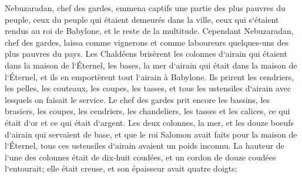 \verse Nebuzaradan, chef des gardes, emmena captifs une partie des plus pauvres du peuple, ceux du peuple qui étaient demeurés dans la ville, ceux qui s`étaient rendus au roi de Babylone, et le reste de la multitude. 
\verse Cependant Nebuzaradan, chef des gardes, laissa comme vignerons et comme laboureurs quelques-uns des plus pauvres du pays. 
\verse Les Chaldéens brisèrent les colonnes d`airain qui étaient dans la maison de l`Éternel, les bases, la mer d`airain qui était dans la maison de l`Éternel, et ils en emportèrent tout l`airain à Babylone. 
\verse Ils prirent les cendriers, les pelles, les couteaux, les coupes, les tasses, et tous les ustensiles d`airain avec lesquels on faisait le service. 
\verse Le chef des gardes prit encore les bassins, les brasiers, les coupes, les cendriers, les chandeliers, les tasses et les calices, ce qui était d`or et ce qui était d`argent. 
\verse Les deux colonnes, la mer, et les douze boeufs d`airain qui servaient de base, et que le roi Salomon avait faits pour la maison de l`Éternel, tous ces ustensiles d`airain avaient un poids inconnu. 
\verse La hauteur de l`une des colonnes était de dix-huit coudées, et un cordon de douze coudées l`entourait; elle était creuse, et son épaisseur avait quatre doigts; 
